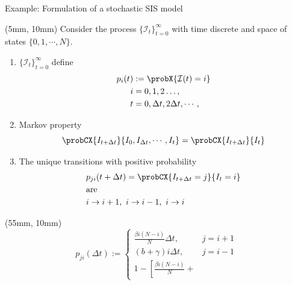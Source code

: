 %
%
%
\begin{frame}{Example: Formulation of a stochastic SIS model}
    \begin{textblock*}{55mm}(5mm, 10mm)
        Consider the process $\{\mathcal{I}_t\}_{t=0} ^ \infty$ with 
        time discrete and space of states $\{0,1,\cdots, N \}$.
        \begin{enumerate}[(H-1)]
            \item
                $
                    \{\mathcal{I}_t\}_{t=0} ^ \infty
                $ define
                \begin{align*}
                    p_i(t) &:= \probX{\mathcal{I}(t) = i}
                    \\
                    i &= 0,1,2\dots,
                    \\
                    t &= 0, \Delta t, 2 \Delta t, \cdots,
                \end{align*}
            \item
                Markov property
                $$
                    \probCX{I_{t + \Delta t}}{  I_0, I_{\Delta t}, \cdots, I_t}
                    =\probCX{I_{t + \Delta t} }{I_t}
                $$
            \item
                The unique transitions with positive 
                probability
                \begin{align*}
                    & p_{ji}(t + \Delta t)
                    = 
                    \probCX{I_{t + \Delta t} = j}{I_t = i}
                    \\
                    &\text{are}
                    \\
                    & i \to i+1, \ i \to i-1,  \ i \to i
                \end{align*}
        \end{enumerate}
%
%
%
        \begin{textblock*}{50mm}(55mm, 10mm)
            \begin{equation*}
                p_{ji}(\Delta t):=
                    \begin{cases}
                        \frac{\beta i (N - i)}{N} \Delta t, 
                            & j = i + 1
                        \\
                        (b + \gamma) i \Delta t, 
                            & j = i - 1
                        \\
                        1 - 
                        \left[
                            \frac{\beta i (N - i)}{N} +

\end{cases}
\end{equation*}
\end{textblock*}
\end{textblock*}
\end{frame}
